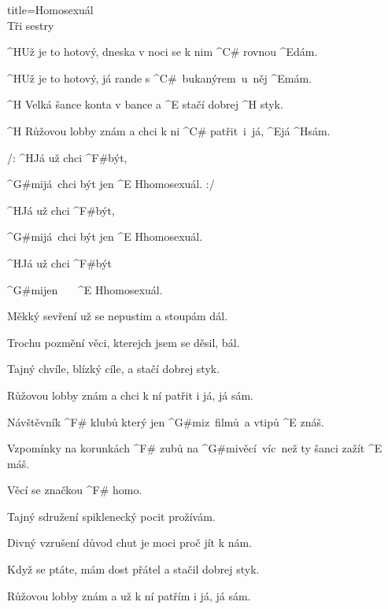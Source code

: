 \begin{song}{title=\predtitle\centering Homosexuál \\\large Tři sestry \vspace*{-0.3cm}}  %

\begin{centerjustified}
\velky

\sloka
	^{H}Už je to hotový, dneska v noci se k nim ^{C# \z}rovnou ^{E}dám.

	^{H}Už je to hotový, já rande s ^{\z C# \:\:\,}bukanýrem~u~něj ^{E}mám.

	^{H \z}Velká šance konta v bance a ^{E \z}stačí dobrej ^{H \z}styk.

	^{H \z}Růžovou lobby znám a chci k ni ^{\z C# \:}patřit~i~já, ^{E}já ^{H}sám.

	/: ^{H}Já už chci ^{F#}být,

	^{G#mi\z}já~chci být jen ^{E \z H}homosexuál. :/

	^{H}Já už chci ^{F#}být,

	^{G#mi\z}já~chci být jen ^{E \z H}homosexuál.

	^{H}Já už chci ^{F#\z}být~~

	^{G#mi\z}jen~~~ ^{E \z H}homosexuál.

\sloka
	Měkký sevření už se nepustim a stoupám dál.

	Trochu pozmění věci, kterejch jsem se děsil, bál.

	Tajný chvíle, blízký cíle, a stačí dobrej styk.

	Růžovou lobby znám a chci k ní patřit i já, já sám.


	Návštěvník ^{F# \z}klubů který jen ^{G#mi}z~filmů~a vtipů ^{E \z}znáš.

	Vzpomínky na korunkách ^{F# \z}zubů na ^{G#mi}věcí~víc~než ty šanci zažít ^{E \,}máš.

	Věcí se značkou ^{F# \z}homo.

\sloka
	Tajný sdružení spiklenecký pocit prožívám.

	Divný vzrušení důvod chut je moci proč jít k nám.

	Když se ptáte, mám dost přátel a stačil dobrej styk.
	
	Růžovou lobby znám a už k ní patřím i já, já sám.


\end{centerjustified}
\setcounter{Slokočet}{0}
\end{song}
